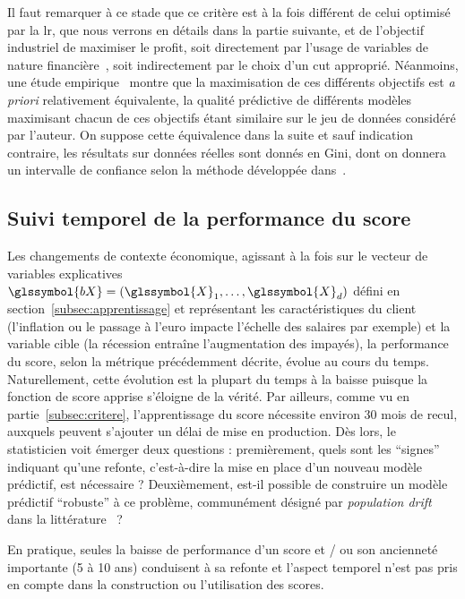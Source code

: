 Il faut remarquer à ce stade que ce critère est à la fois différent de celui optimisé par la \gls{lr}, que nous verrons en détails dans la partie suivante, et de l'objectif industriel de maximiser le profit, soit directement par l'usage de variables de nature financière~\cite{finlay2010credit}, soit indirectement par le choix d'un \gls{cut} approprié. Néanmoins, une étude empirique~\cite{finlay2009we} montre que la maximisation de ces différents objectifs est \textit{a priori} relativement équivalente, la qualité prédictive de différents modèles maximisant chacun de ces objectifs étant similaire sur le jeu de données considéré par l'auteur. On suppose cette équivalence dans la suite et sauf indication contraire, les résultats sur données réelles sont donnés en Gini, dont on donnera un intervalle de confiance selon la méthode développée dans~\cite{sun2014fast}.



\subsection{Suivi temporel de la performance du \gls{score}}

Les changements de contexte économique, agissant à la fois sur le vecteur de variables explicatives $\glssymbol{bX} = (\glssymbol{X}_1, \dots, \glssymbol{X}_d)$ défini en section~\ref{subsec:apprentissage} et représentant les caractéristiques du client (l'inflation ou le passage à l'euro impacte l'échelle des salaires par exemple) et la variable cible (la récession entraîne l'augmentation des impayés), la performance du \gls{score}, selon la métrique précédemment décrite, évolue au cours du temps. Naturellement, cette évolution est la plupart du temps à la baisse puisque la fonction de \gls{score} apprise s'éloigne de la vérité. Par ailleurs, comme vu en partie~\ref{subsec:critere}, l'apprentissage du \gls{score} nécessite environ 30 mois de recul, auxquels peuvent s'ajouter un délai de mise en production. Dès lors, le statisticien voit émerger deux questions : premièrement, quels sont les ``signes'' indiquant qu'une refonte, c'est-à-dire la mise en place d'un nouveau modèle prédictif, est nécessaire ? Deuxièmement, est-il possible de construire un modèle prédictif ``robuste'' à ce problème, communément désigné par \textit{population drift} dans la littérature~\cite{hand1997statistical} ?

En pratique, seules la baisse de performance d'un \gls{score} et / ou son ancienneté importante (5 à 10 ans) conduisent à sa refonte et l'aspect temporel n'est pas pris en compte dans la construction ou l'utilisation des \glspl{score}.

